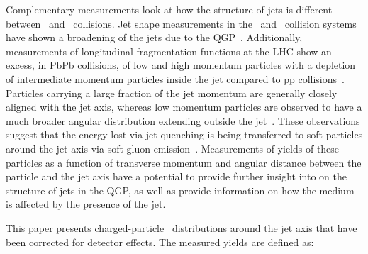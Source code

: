 Complementary measurements look at how the structure of jets is different between \pbpb\ and \pp\
collisions.
Jet shape measurements in the \pp\ and \pbpb\ collision systems have shown 
a broadening of the jets due to the QGP~\cite{Aad:2011sc, Acharya:2018uvf, Chatrchyan:2012mec, Chatrchyan:2013kwa}.
Additionally, measurements of longitudinal fragmentation functions at the LHC show an excess, in PbPb collisions, of low and high momentum particles with a depletion of intermediate momentum particles inside the jet compared to pp collisions~\cite{Aad:2014wha,Chatrchyan:2014ava,Aaboud:2017bzv,Aaboud:2018hpb}. Particles carrying a large fraction of the jet momentum are generally closely
aligned with the jet axis, whereas low momentum particles are observed to have a much broader
angular distribution extending outside the 
jet~\cite{Chatrchyan:2011sx,Khachatryan:2015lha,Khachatryan:2016tfj,Sirunyan:2018jqr}. 
These observations suggest that the energy lost via jet-quenching is being transferred to soft particles around the
jet axis via soft 
gluon emission~\cite{Vitev:2008rz,Ovanesyan:2011xy,Blaizot:2014ula,Qin:2015srf,Escobedo:2016jbm,Casalderrey-Solana:2016jvj,Tachibana:2017syd}. 
Measurements of yields of these particles as a function of transverse momentum and
angular distance between the particle and the jet axis have a potential to provide further insight into
on the structure of jets in the QGP, as well as provide information on how the medium is affected by the presence of the jet. 

This paper presents charged-particle \pt\ distributions around the jet axis that have been corrected for detector effects. The measured yields are defined as:

